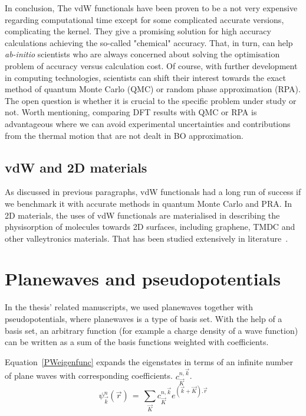 In conclusion, The vdW functionals have been proven to be a not very expensive regarding computational time except for some complicated accurate versions, complicating the kernel. They give a promising solution for high accuracy calculations achieving the so-called "chemical" accuracy. That, in turn, can help \textit{ab-initio} scientists who are always concerned about solving the optimisation problem of accuracy versus calculation cost. Of course, with further development in computing technologies, scientists can shift their interest towards the exact method of quantum Monte Carlo (QMC) or random phase approximation (RPA). The open question is whether it is crucial to the specific problem under study or not. Worth mentioning, comparing DFT results with QMC or RPA is advantageous where we can avoid experimental uncertainties and contributions from the thermal motion that are not dealt in BO approximation.
\subsection{vdW and 2D materials}
As discussed in previous paragraphs, vdW functionals had a long run of success if we benchmark it with accurate methods in quantum Monte Carlo and PRA. In 2D materials, the uses of vdW functionals are materialised in describing the physisorption of molecules towards 2D surfaces, including graphene, TMDC and other valleytronics materials. That has been studied extensively in literature~\cite{Berland2013, Moses2009, Kleis2008, Berland2011,Joel2012, Bergvall2011, Svetla2010, Duy2012, Lee2011H2Cu111, Elias2012, Jiang2009, COOPER201234, Bjork2010, Martin2011}.
\section{Planewaves and pseudopotentials}
\label{planewaves}
In the thesis' related manuscripts, we used planewaves together with pseudopotentials, where planewaves is a type of basis set. With the help of a basis set, an arbitrary function (for example a charge density of a wave function) can be written as a sum of the basis functions weighted with coefficients. 

Equation~\ref{PWeigenfunc} expands the eigenstates in terms of an infinite number of plane waves with corresponding coefficients. $c_{\vec{K}}^{n,\vec{k}}$.
\begin{equation}
\psi_{\vec{k}}^{n}(\vec{r}) \, = \, \sum_{\vec{K}}c_{\vec{K}}^{n,\vec{k}}e^{(\vec{k}+\vec{K}).\vec{r}}
\label{PWeigenfunc}
\end{equation}

